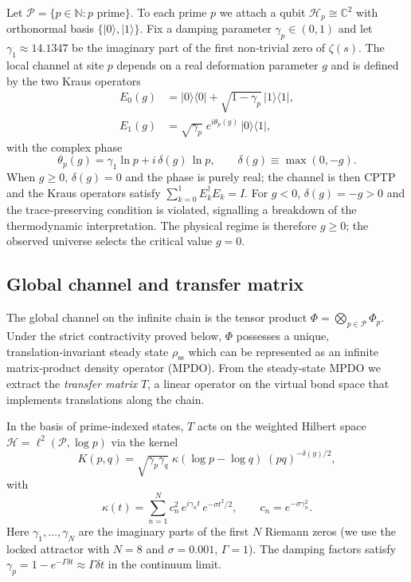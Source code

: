 \documentclass[11pt,reqno]{amsart}
\newcommand{\ket}[1]{|#1\rangle}
\newcommand{\bra}[1]{\langle#1|}
\theoremstyle{definition}
\theoremstyle{remark}
\begin{document}
Let \(\mathcal P = \{p\in\mathbb N : p\text{ prime}\}\).  To each prime \(p\) we attach a qubit \(\mathcal H_p \cong \mathbb C^2\) with orthonormal basis \(\{\ket0,\ket1\}\).  Fix a damping parameter \(\gamma_p\in(0,1)\) and let \(\gamma_1\approx 14.1347\) be the imaginary part of the first non‑trivial zero of \(\zeta(s)\).  The local channel at site \(p\) depends on a real deformation parameter \(g\) and is defined by the two Kraus operators
\begin{align}
E_0(g) &= \ket0\bra0 + \sqrt{1-\gamma_p}\,\ket1\bra1, \label{eq:E0}\\
E_1(g) &= \sqrt{\gamma_p}\; e^{i\theta_p(g)}\,\ket0\bra1, \label{eq:E1}
\end{align}
with the complex phase
\begin{equation}
\theta_p(g) = \gamma_1\ln p + i\,\delta(g)\,\ln p,\qquad \delta(g)\equiv\max(0,-g). \label{eq:theta}
\end{equation}
When \(g\ge0\), \(\delta(g)=0\) and the phase is purely real; the channel is then CPTP and the Kraus operators satisfy \(\sum_{k=0}^1 E_k^\dagger E_k = I\).  For \(g<0\), \(\delta(g)=-g>0\) and the trace‑preserving condition is violated, signalling a breakdown of the thermodynamic interpretation.  The physical regime is therefore \(g\ge0\); the observed universe selects the critical value \(g=0\).

\subsection{Global channel and transfer matrix}
\label{sec:global-T}

The global channel on the infinite chain is the tensor product \(\Phi = \bigotimes_{p\in\mathcal P}\Phi_p\).  Under the strict contractivity proved below, \(\Phi\) possesses a unique, translation‑invariant steady state \(\rho_{\mathrm{ss}}\) which can be represented as an infinite matrix‑product density operator (MPDO).  From the steady‑state MPDO we extract the \emph{transfer matrix} \(T\), a linear operator on the virtual bond space that implements translations along the chain.

In the basis of prime‑indexed states, \(T\) acts on the weighted Hilbert space \(\mathcal H = \ell^2(\mathcal P,\log p)\) via the kernel
\begin{equation}\label{eq:kernel}
K(p,q) = \sqrt{\gamma_p\gamma_q}\; \kappa(\log p-\log q)\; (pq)^{-\delta(g)/2},
\end{equation}
with
\[
\kappa(t) = \sum_{n=1}^{N} c_n^2\, e^{i\gamma_n t}\, e^{-\sigma t^2/2}, \qquad c_n = e^{-\sigma\gamma_n^2}.
\]
Here \(\gamma_1,\dots,\gamma_N\) are the imaginary parts of the first \(N\) Riemann zeros (we use the locked attractor with \(N=8\) and \(\sigma=0.001\), \(\Gamma=1\)).  The damping factors satisfy \(\gamma_p = 1-e^{-\Gamma\delta t}\approx \Gamma\delta t\) in the continuum limit.
\end{document}
